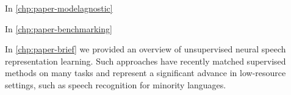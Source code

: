 

In \cref{chp:paper-modelagnostic} 

In \cref{chp:paper-benchmarking} 


In \cref{chp:paper-brief} we provided an overview of unsupervised neural speech representation learning. Such approaches have recently matched supervised methods on many tasks and represent a significant advance in low-resource settings, such as speech recognition for minority languages. 



